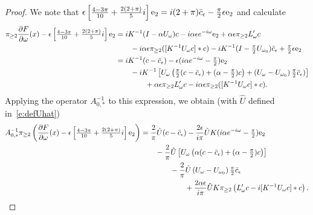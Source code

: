 \begin{proof}
We note that 
$
\epsilon  \left[ \tfrac{4-3\pi}{10} + \tfrac{2(2 + \pi)}{5}i \right] \mathrm{e}_2
= i (2+\pi) \bar{c}_\epsilon - \tfrac{\pi}{2} \epsilon \mathrm{e}_2
$
and calculate 
\begin{alignat*}{1}
\pi_{\geq 2} \frac{\partial F}{\partial \omega}(x) -  \epsilon \left[ \tfrac{4-3\pi}{10} + \tfrac{2(2 + \pi)}{5}i \right] \mathrm{e}_2   &=
		i K^{-1} ( I - \alpha U_{\omega} ) c  -
		 i  \alpha \epsilon e^{-i \omega} \mathrm{e}_2 + 
		\alpha \epsilon \pi_{\geq 2} L_{\omega}' c \\
		&\qquad - i \alpha \epsilon \pi_{\geq 2} ([ K^{-1} U_\omega c ] *c  ) - i K^{-1} ( I - \tfrac{\pi}{2} U_{\omega_0}) \bar{c}_\epsilon +  \tfrac{\pi}{2} \epsilon \mathrm{e}_2\\
		&= i K^{-1} ( c - \bar{c}_\epsilon) - \epsilon  (i  \alpha e^{-i \omega}  -  \tfrac{\pi}{2} ) \mathrm{e}_2\\
		&\qquad
		-i K^{-1} \left[  U_\omega \left(  \tfrac{\pi}{2} ( c - \bar{c}_\epsilon) + ( \alpha - \tfrac{\pi}{2}) c  \right) + \left( U_\omega - U_{\omega_0} \right) \tfrac{\pi}{2} \bar{c}_\epsilon) \right]
		\\
		&\qquad\qquad
			+ \alpha \epsilon \pi_{\geq 2} L_{\omega}' c 
			- i \alpha \epsilon \pi_{\geq 2} ([ K^{-1} U_\omega c ] *c ) .
\end{alignat*}	
Applying the operator $A_{0,*}^{-1}$ to this expression, we obtain (with $\hat{U}$ defined in~\eqref{e:defUhat})
%	
\begin{alignat*}{1}
A_{0,*}^{-1}  \pi_{\geq 2}\left( \frac{\partial F}{\partial \omega}(x) -  \epsilon \left[ \tfrac{4-3\pi}{10} + \tfrac{2(2 + \pi)}{5}i \right] \e_2  \right) 
			&= \frac{2}{\pi} \hat{U}  ( c - \bc_\epsilon) 
			- \frac{2 \epsilon}{i \pi} \hat{U} K  (i  \alpha  e^{-i \omega}  -  \pp  ) \e_2 \\
			&\qquad
			-\frac{2}{\pi} \hat{U} \left[  U_\omega \left(  \alpha ( c - \bc_\epsilon) + ( \alpha - \pp) c  \right) \right]
		    \\	&\qquad\qquad
			-\frac{2}{\pi} \hat{U} \left( U_\omega - U_{\omega_0} \right) \pp \bc_\epsilon  
			\\
			&\qquad\qquad\qquad 
			+ \frac{2 \alpha \epsilon}{i \pi} \hat{U} K \pi_{\geq 2} \left(  L_{\omega}' c - i [ K^{-1} U_\omega c ] *c  \right)  .

\end{alignat*}
\end{proof}
